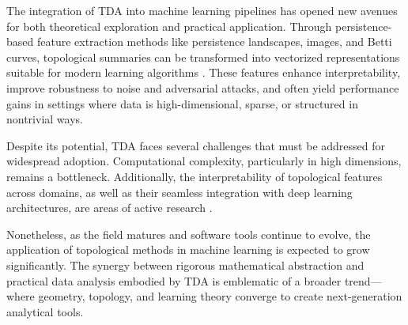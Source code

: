 \documentclass[9pt, twoside, twocolumn]{extarticle}
\begin{document}
    The integration of TDA into machine learning pipelines has opened new avenues for both theoretical exploration and practical application. Through persistence-based feature extraction methods like persistence landscapes, images, and Betti curves, topological summaries can be transformed into vectorized representations suitable for modern learning algorithms \cite{bubenik2015statistical, adams2017persistence}. These features enhance interpretability, improve robustness to noise and adversarial attacks, and often yield performance gains in settings where data is high-dimensional, sparse, or structured in nontrivial ways.

    Despite its potential, TDA faces several challenges that must be addressed for widespread adoption. Computational complexity, particularly in high dimensions, remains a bottleneck. Additionally, the interpretability of topological features across domains, as well as their seamless integration with deep learning architectures, are areas of active research \cite{hofer2017deep, rieck2020tda}.

    Nonetheless, as the field matures and software tools continue to evolve, the application of topological methods in machine learning is expected to grow significantly. The synergy between rigorous mathematical abstraction and practical data analysis embodied by TDA is emblematic of a broader trend—where geometry, topology, and learning theory converge to create next-generation analytical tools.


\fontacknowledgment


\end{document}
